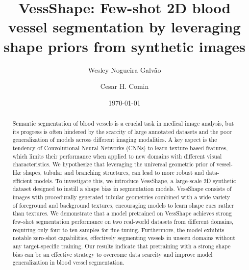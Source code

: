 \documentclass[%
reprint,
nofootinbib,
 amsmath,amssymb,
aps,
superscriptaddress,
showkeys,
longbibliography
]{revtex4-1}
\begin{document}



\title{VessShape: Few-shot 2D blood vessel segmentation by leveraging shape priors from synthetic images}

\author{Wesley Nogueira Galvão}


\author{Cesar H. Comin}

\date{\today}%

\begin{abstract}

Semantic segmentation of blood vessels is a crucial task in medical image analysis, but its progress is often hindered by the scarcity of large annotated datasets and the poor generalization of models across different imaging modalities. A key aspect is the tendency of Convolutional Neural Networks (CNNs) to learn texture-based features, which limits their performance when applied to new domains with different visual characteristics. We hypothesize that leveraging the universal geometric prior of vessel-like shapes, tubular and branching structures, can lead to more robust and data-efficient models. To investigate this, we introduce VessShape, a large-scale 2D synthetic dataset designed to instill a shape bias in segmentation models. VessShape consists of images with procedurally generated tubular geometries combined with a wide variety of foreground and background textures, encouraging models to learn shape cues rather than textures. We demonstrate that a model pretrained on VessShape achieves strong few-shot segmentation performance on two real-world datasets from different domains, requiring only four to ten samples for fine-tuning. Furthermore, the model exhibits notable zero-shot capabilities, effectively segmenting vessels in unseen domains without any target-specific training. Our results indicate that pretraining with a strong shape bias can be an effective strategy to overcome data scarcity and improve model generalization in blood vessel segmentation.

\end{abstract}
\end{document}
